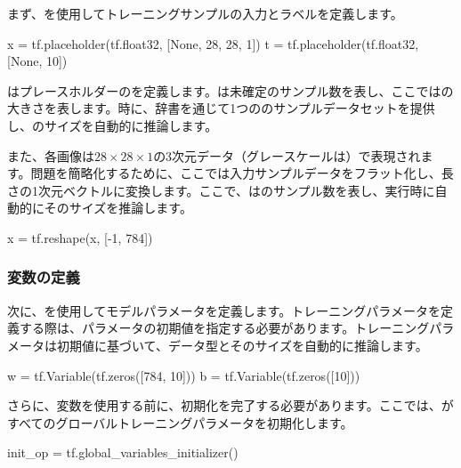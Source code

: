 \begin{content}
\begin{content}
まず、を使用してトレーニングサンプルの入力とラベルを定義します。

\begin{leftbar}
\begin{python}
x = tf.placeholder(tf.float32, [None, 28, 28, 1])
t = tf.placeholder(tf.float32, [None, 10])
\end{python}
\end{leftbar}

はプレースホルダーのを定義します。は未確定のサンプル数を表し、ここではの大きさを表します。時に、辞書を通じて1つののサンプルデータセットを提供し、のサイズを自動的に推論します。

また、各画像は$ 28 \times 28 \times 1 $の3次元データ（グレースケールは）で表現されます。問題を簡略化するために、ここでは入力サンプルデータをフラット化し、長さの1次元ベクトルに変換します。ここで、はのサンプル数を表し、実行時に自動的にそのサイズを推論します。

\begin{leftbar}
\begin{python}
x = tf.reshape(x, [-1, 784])
\end{python}
\end{leftbar}

\subsubsection{変数の定義}

次に、を使用してモデルパラメータを定義します。トレーニングパラメータを定義する際は、パラメータの初期値を指定する必要があります。トレーニングパラメータは初期値に基づいて、データ型とそのサイズを自動的に推論します。

\begin{leftbar}
\begin{python}
w = tf.Variable(tf.zeros([784, 10]))
b = tf.Variable(tf.zeros([10]))
\end{python}
\end{leftbar}

さらに、変数を使用する前に、初期化を完了する必要があります。ここでは、がすべてのグローバルトレーニングパラメータを初期化します。

\begin{leftbar}
\begin{python}
init_op = tf.global_variables_initializer()
\end{python}
\end{leftbar}


\end{content}
\end{content}
